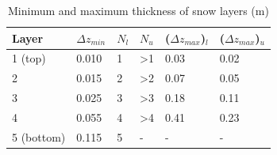 \documentclass[12pt,authoryear]{elsarticle}
\numberwithin{equation}{section} %
\begin{document}
\begin{table}[h]
\centering
\caption{Minimum and maximum thickness of snow layers (m)}
\label{tab:minimum_maximum_thickness}
\begin{tabular}{p{3cm}p{2cm}p{2cm}p{2cm}p{2cm}p{2cm}}
\hline
Layer & $\Delta z_{min}$ & $N_{l}$ & $N_{u}$ & ($\Delta z_{max}$)$_l$ & ($\Delta z_{max}$)$_u$ \\
\hline
1 (top) & 0.010 & 1 & >1 & 0.03 & 0.02 \\
2 & 0.015 & 2 & >2 & 0.07 & 0.05 \\
3 & 0.025 & 3 & >3 & 0.18 & 0.11 \\
4 & 0.055 & 4 & >4 & 0.41 & 0.23 \\
5 (bottom) & 0.115 & 5 & - & - & -\\
\hline
\end{tabular}
\end{table}
\end{document}
